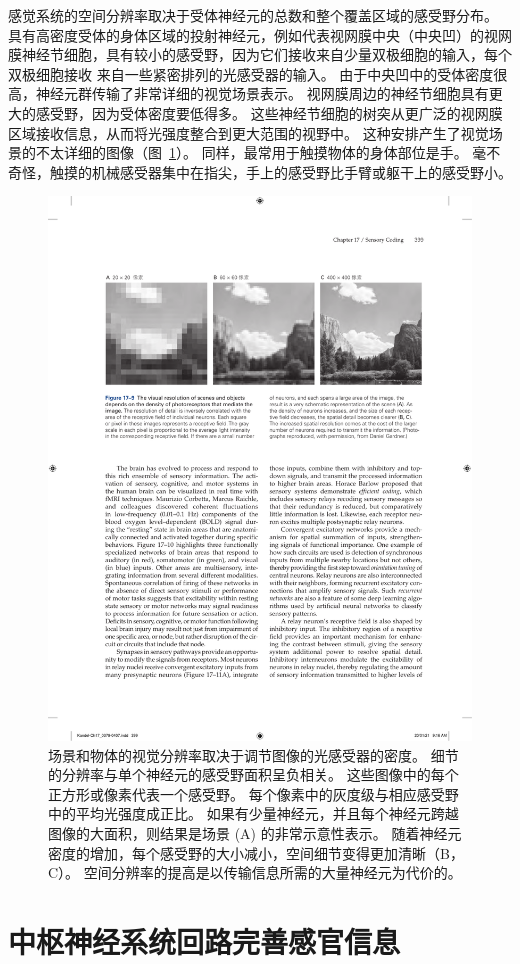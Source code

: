 感觉系统的空间分辨率取决于受体神经元的总数和整个覆盖区域的感受野分布。
具有高密度受体的身体区域的投射神经元，例如代表视网膜中央（中央凹）的视网膜神经节细胞，具有较小的感受野，因为它们接收来自少量双极细胞的输入，每个双极细胞接收 来自一些紧密排列的光感受器的输入。
由于中央凹中的受体密度很高，神经元群传输了非常详细的视觉场景表示。
视网膜周边的神经节细胞具有更大的感受野，因为受体密度要低得多。
这些神经节细胞的树突从更广泛的视网膜区域接收信息，从而将光强度整合到更大范围的视野中。
这种安排产生了视觉场景的不太详细的图像（图~\ref{fig:17_9}）。
同样，最常用于触摸物体的身体部位是手。
毫不奇怪，触摸的机械感受器集中在指尖，手上的感受野比手臂或躯干上的感受野小。


\begin{figure}[htbp]
	\centering
	\includegraphics[width=0.7\linewidth]{chap17/fig_17_9}
	\caption{场景和物体的视觉分辨率取决于调节图像的光感受器的密度。
		细节的分辨率与单个神经元的感受野面积呈负相关。
		这些图像中的每个正方形或像素代表一个感受野。
		每个像素中的灰度级与相应感受野中的平均光强度成正比。
		如果有少量神经元，并且每个神经元跨越图像的大面积，则结果是场景 (A) 的非常示意性表示。 
		随着神经元密度的增加，每个感受野的大小减小，空间细节变得更加清晰（B，C）。
		空间分辨率的提高是以传输信息所需的大量神经元为代价的。}
	\label{fig:17_9}
\end{figure}



\section{中枢神经系统回路完善感官信息}

